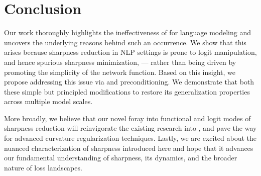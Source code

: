 \section{Conclusion}
Our work thoroughly highlights the ineffectiveness of \SAM for language modeling and uncovers the underlying reasons behind such an 
occurrence. We show that this arises because sharpness reduction in NLP settings is prone to logit manipulation, and hence spurious sharpness
minimization, --- rather than being driven by promoting the simplicity of the network function. Based on this insight, 
we propose addressing this issue via \funcSAM and preconditioning. We demonstrate that both these simple but  principled modifications to \SAM restore its generalization properties across multiple model scales. 

More broadly, we believe that our novel foray into  functional and logit modes of sharpness reduction will reinvigorate the existing research into \SAM, and pave the way for advanced curvature regularization techniques. 
Lastly, we are excited about the nuanced characterization of sharpness introduced here and hope that it advances our fundamental understanding of sharpness, its dynamics, and the broader nature of loss landscapes.










\clearpage




